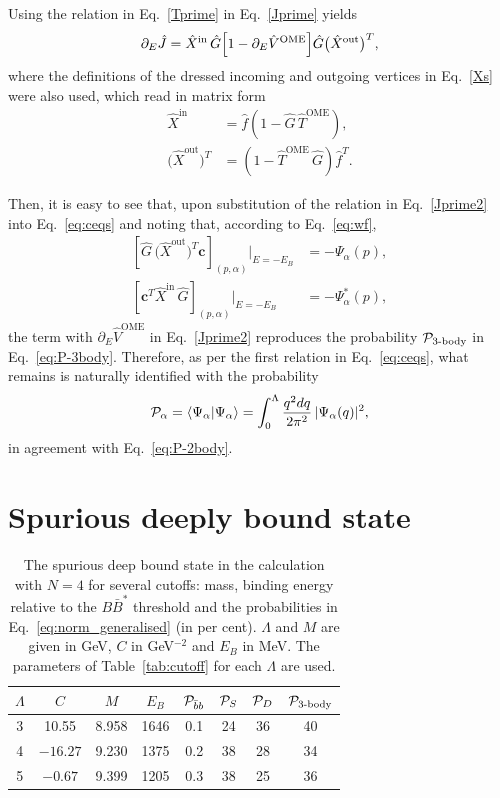 \documentclass[aps,prd,showpacs,amsmath,twocolumn,superscriptaddress,floatfix,nofootinbib,notitlepage]{revtex4-2}
\newcommand{\be}{\begin{equation}}
\newcommand{\ee}{\end{equation}}
\newcommand{\dqr}{\frac{q^2dq}{2\pi^2}}
\begin{document}
Using the relation in Eq.~\eqref{Tprime} in Eq.~\eqref{Jprime}
yields
\be
\partial_E \hat{J}=\hat{X}^{\text {in}}\,\hat{G}\Bigl[1
-\partial_E \hat{V}^{\mathrm{OME}}\Bigr]\hat{G}\bigl(\hat{X}^{\text {out}}\bigr)^T,
\label{Jprime2}
\ee
where the definitions of the dressed incoming and outgoing vertices in Eq.~\eqref{Xs} were also used, which read in matrix form
\be
\begin{split}
\hat{X}^{\text {in}} &=\hat{f}\left(1-\hat{G}\,\hat{T}^{\text {OME}}\right) , \\[1mm]
\bigl(\hat{X}^{\text {out}}\bigr)^T&=\left(1-\hat{T}^{\text {OME}}\,\hat{G}\right)\hat{f}^T.
\label{eq:Xmatrix}
\end{split}
\ee

Then, it is easy to see that, upon substitution of the relation in Eq.~\eqref{Jprime2} into Eq.~\eqref{eq:ceqs} and noting that, according to Eq.~\eqref{eq:wf},
\be
\begin{split}
\left[ \hat G\, \bigl(\hat X^\text{out} \bigr)^T \bm{c} \right]_{(p,\alpha)}\Big|_{E=-E_B} &=-\Psi_\alpha(p),\\
\left[ \bm{c}^T \hat X^\text{in} \,\hat G \right]_{(p,\alpha)}\Big|_{E=-E_B} &=-\Psi_\alpha^*(p),
\end{split}
\ee
the term with $\partial_E \hat{V}^{\mathrm{OME}}$ in Eq.~\eqref{Jprime2} reproduces the probability ${\cal P}_{\text{3-body}}$ in Eq.~\eqref{eq:P-3body}. Therefore, as per the first relation in Eq.~\eqref{eq:ceqs}, what remains is naturally identified with the probability
\be
\mathcal{P}_\alpha=\braket{\Psi_\alpha|\Psi_\alpha}=\int_0^\Lambda\dqr\,|\Psi_\alpha(q)|^2,
\ee
in agreement with Eq.~\eqref{eq:P-2body}.


\section{Spurious deeply bound state}
\label{app:deep}

\begin{table}[t!] 
\centering 
\caption{The spurious deep bound state in the calculation with $N=4$ for several cutoffs: mass, binding energy relative to the $B\bar{B}^*$ threshold and the probabilities in Eq.~\eqref{eq:norm_generalised} (in per cent). $\Lambda$ and $M$ are given in GeV, $C$ in GeV$^{-2}$ and $E_B$ in MeV. The parameters of Table~\ref{tab:cutoff} for each $\Lambda$ are used.}
\label{tab:deep}
\begin{ruledtabular}
\small
\setlength{\tabcolsep}{1.3pt}
\begin{tabular}{cc|cc|cccc}
$\Lambda$ & $C$ & $M$ & $E_B$ & ${\cal P}_{\bar{b}b}$ & ${\cal P}_S$ & ${\cal P}_D$ & ${\cal P}_{\text{3-body}}$ \\
\hline
3 & 10.55 & 8.958 & 1646 & 0.1 & 24 & 36 & 40 \\
4 & $-16.27$ & 9.230 & 1375 & 0.2 & 38 & 28 & 34 \\
5 & $-0.67$ & 9.399 & 1205 & 0.3 & 38 & 25 & 36
\end{tabular}
\end{ruledtabular}
\end{table}
\end{document}
